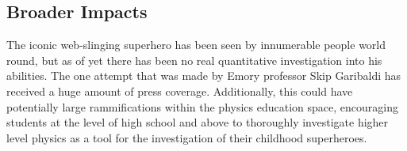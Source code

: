 \subsection{Broader Impacts}
The iconic web-slinging superhero has been seen by innumerable people world round, but as of yet there has been no real quantitative investigation into his abilities. The one attempt that was made by Emory professor Skip Garibaldi has received a huge amount of press coverage. Additionally, this could have potentially large rammifications within the physics education space, encouraging students at the level of high school and above to thoroughly investigate higher level physics as a tool for the investigation of their childhood superheroes.
